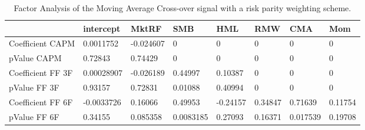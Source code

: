 \begin{table}[H]
\centering
\begin{tabular}{llllllll}
& intercept & MktRF & SMB & HML & RMW & CMA & Mom \\ 
\hline 
Coefficient CAPM & 0.0011752 & -0.024607 & 0 & 0 & 0 & 0 & 0 \\ 
pValue CAPM & 0.72843 & 0.74429 & 0 & 0 & 0 & 0 & 0 \\ 
Coefficient FF 3F & 0.00028907 & -0.026189 & 0.44997 & 0.10387 & 0 & 0 & 0 \\ 
pValue FF 3F & 0.93157 & 0.72831 & 0.01088 & 0.40994 & 0 & 0 & 0 \\ 
Coefficient FF 6F & -0.0033726 & 0.16066 & 0.49953 & -0.24157 & 0.34847 & 0.71639 & 0.11754 \\ 
pValue FF 6F & 0.34155 & 0.085358 & 0.0083185 & 0.27093 & 0.16371 & 0.017539 & 0.19708 \\ 
\hline
\end{tabular}
\caption{Factor Analysis of the Moving Average Cross-over signal with a risk parity weighting scheme.}
\label{MARP_FACTOR}
\end{table}